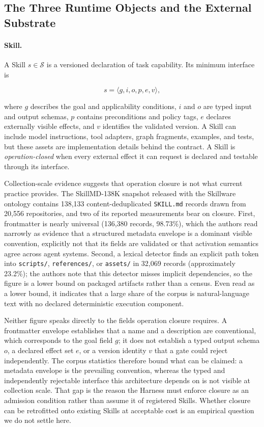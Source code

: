 \subsection{The Three Runtime Objects and the External Substrate}
\label{sec:runtime-objects}

\paragraph{Skill.}
A Skill $s\in\mathcal{S}$ is a versioned declaration of task capability. Its minimum interface is

\begin{equation}
s=\langle g,i,o,p,e,v\rangle,
\end{equation}

where $g$ describes the goal and applicability conditions, $i$ and $o$ are typed input and output schemas, $p$ contains preconditions and policy tags, $e$ declares externally visible effects, and $v$ identifies the validated version. A Skill can include model instructions, tool adapters, graph fragments, examples, and tests, but these assets are implementation details behind the contract. A Skill is \textit{operation-closed} when every external effect it can request is declared and testable through its interface.

Collection-scale evidence suggests that operation closure is not what current practice provides. The SkillMD-138K snapshot released with the Skillware ontology \cite{fan2026skillware} contains 138,133 content-deduplicated \texttt{SKILL.md} records drawn from 20,556 repositories, and two of its reported measurements bear on closure. First, frontmatter is nearly universal (136,380 records, 98.73\%), which the authors read narrowly as evidence that a structured metadata envelope is a dominant visible convention, explicitly not that its fields are validated or that activation semantics agree across agent systems. Second, a lexical detector finds an explicit path token into \texttt{scripts/}, \texttt{references/}, or \texttt{assets/} in 32,069 records (approximately 23.2\%); the authors note that this detector misses implicit dependencies, so the figure is a lower bound on packaged artifacts rather than a census. Even read as a lower bound, it indicates that a large share of the corpus is natural-language text with no declared deterministic execution component.

Neither figure speaks directly to the fields operation closure requires. A frontmatter envelope establishes that a name and a description are conventional, which corresponds to the goal field $g$; it does not establish a typed output schema $o$, a declared effect set $e$, or a version identity $v$ that a gate could reject independently. The corpus statistics therefore bound what can be claimed: a metadata envelope is the prevailing convention, whereas the typed and independently rejectable interface this architecture depends on is not visible at collection scale. That gap is the reason the Harness must enforce closure as an admission condition rather than assume it of registered Skills. Whether closure can be retrofitted onto existing Skills at acceptable cost is an empirical question we do not settle here.

